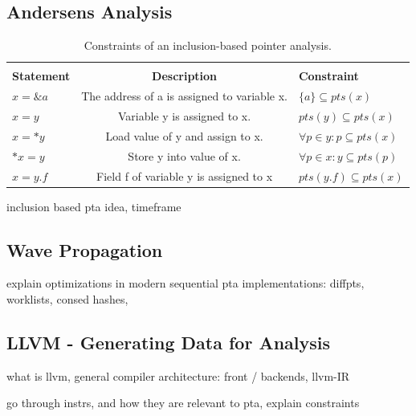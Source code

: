 \subsection{Andersens Analysis}
\begin{table}
    \begin{center}
        \caption{Constraints of an inclusion-based pointer analysis.}
        \label{tab:ander}
        \begin{tabular}{l|c|l}
            \hline                                                                                                         \\
            \textbf{Statement} & \textbf{Description}                        & \textbf{Constraint}                         \\
            \hline
            $x = \&a$          & The address of a is assigned to variable x. & $\{a\} \subseteq pts(x)$                    \\
            $x = y$            & Variable y is assigned to x.                & $pts(y) \subseteq pts(x)$                   \\
            $x = *y$           & Load value of y and assign to x.            & $\forall p \in y \colon p \subseteq pts(x)$ \\
            $*x = y$           & Store y into value of x.                    & $\forall p \in x \colon y \subseteq pts(p)$ \\
            $x = y.f$          & Field f of variable y is assigned to x      & $pts(y.f) \subseteq pts(x)$                 \\
        \end{tabular}
    \end{center}
\end{table}

inclusion based pta idea, timeframe
\subsection{Wave Propagation}
explain optimizations in modern sequential pta implementations: diffpts, worklists, consed hashes, \cite{waveprop}
\subsection{LLVM - Generating Data for Analysis}
what is llvm, general compiler architecture: front / backends, llvm-IR

go through instrs, and how they are relevant to pta, explain constraints \cite{lin2015alias}
